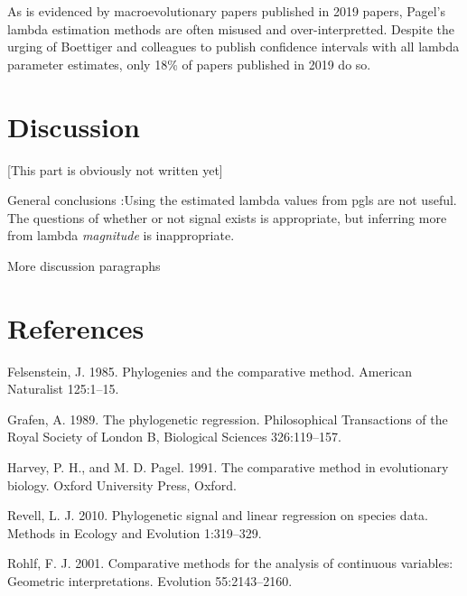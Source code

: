 \documentclass[
]{article}
\begin{document}
As is evidenced by macroevolutionary papers published in 2019 papers,
Pagel's lambda estimation methods are often misused and
over-interpretted. Despite the urging of Boettiger and colleagues to
publish confidence intervals with all lambda parameter estimates, only
18\% of papers published in 2019 do so.

\hypertarget{discussion}{%
\section{Discussion}\label{discussion}}

{[}This part is obviously not written yet{]} \hfill\break

General conclusions :Using the estimated lambda values from pgls are not
useful. The questions of whether or not signal exists is appropriate,
but inferring more from lambda \emph{magnitude} is inappropriate.
\hfill\break

More discussion paragraphs

\newpage

\hypertarget{references}{%
\section{References}\label{references}}

\setlength{\parindent}{-0.25in} \setlength{\leftskip}{0.25in}
\setlength{\parskip}{8pt} \noindent

\hypertarget{refs}{}
\leavevmode\hypertarget{ref-Felsenstein1985}{}%
Felsenstein, J. 1985. Phylogenies and the comparative method. American
Naturalist 125:1--15.

\leavevmode\hypertarget{ref-Grafen1989}{}%
Grafen, A. 1989. The phylogenetic regression. Philosophical Transactions
of the Royal Society of London B, Biological Sciences 326:119--157.

\leavevmode\hypertarget{ref-HarveyPagel1991}{}%
Harvey, P. H., and M. D. Pagel. 1991. The comparative method in
evolutionary biology. Oxford University Press, Oxford.

\leavevmode\hypertarget{ref-Revell2010}{}%
Revell, L. J. 2010. Phylogenetic signal and linear regression on species
data. Methods in Ecology and Evolution 1:319--329.

\leavevmode\hypertarget{ref-Rohlf2001}{}%
Rohlf, F. J. 2001. Comparative methods for the analysis of continuous
variables: Geometric interpretations. Evolution 55:2143--2160.

\newpage
\end{document}
